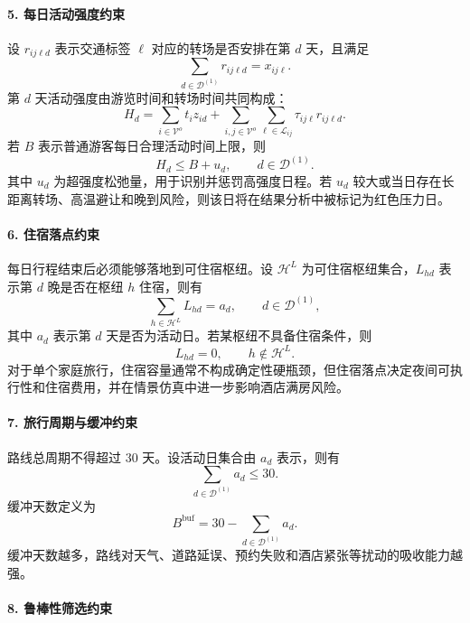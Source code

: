 \documentclass[UTF8,zihao=-4,a4paper]{ctexart}
\begin{document}
\paragraph{5. 每日活动强度约束}

设 $r_{ij\ell d}$ 表示交通标签 $\ell$ 对应的转场是否安排在第 $d$ 天，且满足
\[
\sum_{d\in\mathcal{D}^{(1)}}r_{ij\ell d}=x_{ij\ell}.
\]
第 $d$ 天活动强度由游览时间和转场时间共同构成：
\[
H_d
=
\sum_{i\in\mathcal{V}^{o}}t_i z_{id}
+
\sum_{i,j\in\mathcal{V}^{o}}
\sum_{\ell\in\mathcal{L}_{ij}}
\tau_{ij\ell}r_{ij\ell d}.
\]
若 $B$ 表示普通游客每日合理活动时间上限，则
\[
H_d\leq B+u_d,\qquad d\in\mathcal{D}^{(1)}.
\]
其中 $u_d$ 为超强度松弛量，用于识别并惩罚高强度日程。若 $u_d$ 较大或当日存在长距离转场、高温避让和晚到风险，则该日将在结果分析中被标记为红色压力日。

\paragraph{6. 住宿落点约束}

每日行程结束后必须能够落地到可住宿枢纽。设 $\mathcal{H}^{L}$ 为可住宿枢纽集合，$L_{hd}$ 表示第 $d$ 晚是否在枢纽 $h$ 住宿，则有
\[
\sum_{h\in\mathcal{H}^{L}}L_{hd}=a_d,
\qquad d\in\mathcal{D}^{(1)},
\]
其中 $a_d$ 表示第 $d$ 天是否为活动日。若某枢纽不具备住宿条件，则
\[
L_{hd}=0,\qquad h\notin\mathcal{H}^{L}.
\]
对于单个家庭旅行，住宿容量通常不构成确定性硬瓶颈，但住宿落点决定夜间可执行性和住宿费用，并在情景仿真中进一步影响酒店满房风险。

\paragraph{7. 旅行周期与缓冲约束}

路线总周期不得超过 $30$ 天。设活动日集合由 $a_d$ 表示，则有
\[
\sum_{d\in\mathcal{D}^{(1)}} a_d \leq 30.
\]
缓冲天数定义为
\[
B^{\mathrm{buf}}=30-\sum_{d\in\mathcal{D}^{(1)}}a_d.
\]
缓冲天数越多，路线对天气、道路延误、预约失败和酒店紧张等扰动的吸收能力越强。

\paragraph{8. 鲁棒性筛选约束}
\end{document}
